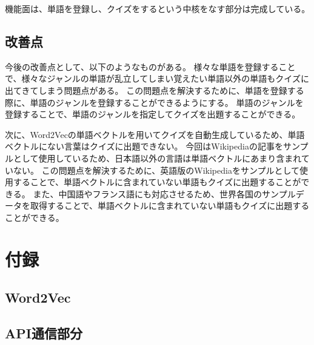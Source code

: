 \documentclass[11pt,a4paper]{jsarticle}
\begin{document}
機能面は、単語を登録し、クイズをするという中核をなす部分は完成している。



\subsection{改善点}
今後の改善点として、以下のようなものがある。
様々な単語を登録することで、様々なジャンルの単語が乱立してしまい覚えたい単語以外の単語もクイズに出てきてしまう問題点がある。
この問題点を解決するために、単語を登録する際に、単語のジャンルを登録することができるようにする。
単語のジャンルを登録することで、単語のジャンルを指定してクイズを出題することができる。

次に、Word2Vecの単語ベクトルを用いてクイズを自動生成しているため、単語ベクトルにない言葉はクイズに出題できない。
今回はWikipediaの記事をサンプルとして使用しているため、日本語以外の言語は単語ベクトルにあまり含まれていない。
この問題点を解決するために、英語版のWikipediaをサンプルとして使用することで、単語ベクトルに含まれていない単語もクイズに出題することができる。
また、中国語やフランス語にも対応させるため、世界各国のサンプルデータを取得することで、単語ベクトルに含まれていない単語もクイズに出題することができる。

\section{付録}

\subsection{Word2Vec}\label{sec:Word2Vec}

\subsection{API通信部分}
\end{document}
